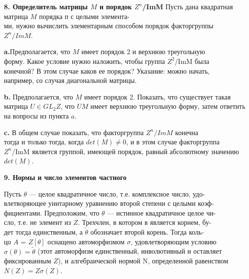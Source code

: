 \medskip

{\noindent\bf8. Определитель матрицы $M$ и порядок $\mathit{Z}^n$/ImM} 
Пусть дана квадратная матрица $M$ порядка п с целыми 
элемента-\\ми, нужно вычислить элементарным способом порядок факторгруппы\\ 
$\mathit{Z}^n/ImM$.

\pagebreak

{\bf a.}Предполагается, что $M$ имеет порядок 2 и верхнюю треугольную\\ 
форму. Какое условие нужно наложить, чтобы группа $\mathit{Z}^2$/ImM была\\ конечной? В этом случае каков ее порядок? Указание: можно начать,\\ например, со случая диагональной матрицы. 

\medskip

{\bf b.} Предполагается, что $M$ имеет порядок 2. Показать, что 
существует такая матрица $U \in GL_2\mathit{Z}$, что $UM$ имеет верхнюю 
треугольную форму, затем ответить на вопросы из пункта $a$. 

\medskip

{\bf c.} В общем случае показать, что факторгруппа $\mathit{Z}^n/ImM$ конечна \\
тогда и только тогда, когда $det(M)\ne 0$, и в этом случае факторгруппа \\
$\mathit{Z}^n$/ImM является группой, имеющей порядок, равный абсолютному 
значению $det(M)$.

\medskip

{\noindent\bf 9. Нормы и число элементов частного}

\medskip

Пусть $\theta$ — целое квадратичное число, т.е. комплексное число, 
удо-\\влетворяющее унитарному уравнению второй степени с целыми 
коэф-\\фициентами. Предположим, что $\theta$ — истинное квадратичное целое 
чи-\\сло, т.е. не элемент из $\mathit{Z}$. Трехчлен, в котором в является корнем, 
бу-\\дет тогда единственным, а $\tilde{\theta}$ обозначает второй корень. Тогда 
коль-\\цо $A$ = $\mathit{Z}[\theta]$ оснащено автоморфизмом $\sigma$, удовлетворяющим условию\\ 
$\sigma(\theta) = \tilde{\theta}$ (этот автоморфизм единственный, инволютивный и оставляет\\ 
фиксированным $\mathit{Z}$), и алгебраической нормой N, определенной 
равенством $N(Z) = Z\sigma(Z)$. 


